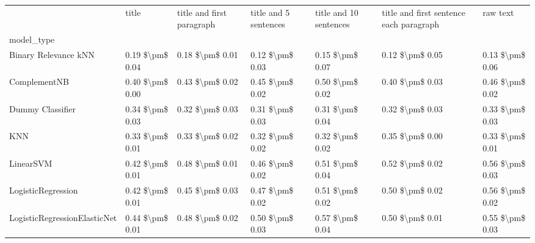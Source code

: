 \begin{tabular}{lllllll}
\toprule
{} &            title & title and first paragraph & title and 5 sentences & title and 10 sentences & title and first sentence each paragraph &             raw text \\
model\_type                      &                  &                           &                       &                        &                                         &                      \\
\midrule
Binary Relevance kNN            &  0.19 \$\textbackslash pm\$ 0.04 &           0.18 \$\textbackslash pm\$ 0.01 &       0.12 \$\textbackslash pm\$ 0.03 &        0.15 \$\textbackslash pm\$ 0.07 &                         0.12 \$\textbackslash pm\$ 0.05 &      0.13 \$\textbackslash pm\$ 0.06 \\
ComplementNB                    &  0.40 \$\textbackslash pm\$ 0.00 &           0.43 \$\textbackslash pm\$ 0.02 &       0.45 \$\textbackslash pm\$ 0.02 &        0.50 \$\textbackslash pm\$ 0.02 &                         0.40 \$\textbackslash pm\$ 0.03 &      0.46 \$\textbackslash pm\$ 0.02 \\
Dummy Classifier                &  0.34 \$\textbackslash pm\$ 0.03 &           0.32 \$\textbackslash pm\$ 0.03 &       0.31 \$\textbackslash pm\$ 0.03 &        0.31 \$\textbackslash pm\$ 0.04 &                         0.32 \$\textbackslash pm\$ 0.03 &      0.33 \$\textbackslash pm\$ 0.03 \\
KNN                             &  0.33 \$\textbackslash pm\$ 0.01 &           0.33 \$\textbackslash pm\$ 0.02 &       0.32 \$\textbackslash pm\$ 0.02 &        0.32 \$\textbackslash pm\$ 0.02 &                         0.35 \$\textbackslash pm\$ 0.00 &      0.33 \$\textbackslash pm\$ 0.01 \\
LinearSVM                       &  0.42 \$\textbackslash pm\$ 0.01 &           0.48 \$\textbackslash pm\$ 0.01 &       0.46 \$\textbackslash pm\$ 0.02 &        0.51 \$\textbackslash pm\$ 0.04 &                         0.52 \$\textbackslash pm\$ 0.02 &      0.56 \$\textbackslash pm\$ 0.03 \\
LogisticRegression              &  0.42 \$\textbackslash pm\$ 0.01 &           0.45 \$\textbackslash pm\$ 0.03 &       0.47 \$\textbackslash pm\$ 0.02 &        0.51 \$\textbackslash pm\$ 0.02 &                         0.50 \$\textbackslash pm\$ 0.02 &      0.56 \$\textbackslash pm\$ 0.02 \\
LogisticRegressionElasticNet    &  0.44 \$\textbackslash pm\$ 0.01 &           0.48 \$\textbackslash pm\$ 0.02 &       0.50 \$\textbackslash pm\$ 0.03 &        0.57 \$\textbackslash pm\$ 0.04 &                         0.50 \$\textbackslash pm\$ 0.01 &      0.55 \$\textbackslash pm\$ 0.03 \\

\end{tabular}
